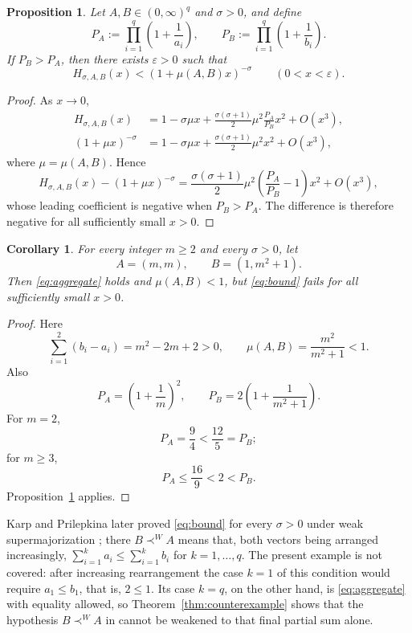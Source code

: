 \documentclass[11pt]{amsart}
\newtheorem{proposition}[theorem]{Proposition}
\newtheorem{corollary}[theorem]{Corollary}
\begin{document}
\begin{proposition}\label{prop:local}
Let $A,B\in(0,\infty)^q$ and $\sigma>0$, and define
\[
 P_A:=\prod_{i=1}^q\left(1+\frac1{a_i}\right),
 \qquad
 P_B:=\prod_{i=1}^q\left(1+\frac1{b_i}\right).
\]
If $P_B>P_A$, then there exists $\varepsilon>0$ such that
\[
 H_{\sigma,A,B}(x)<(1+\mu(A,B)x)^{-\sigma}
 \qquad (0<x<\varepsilon).
\]
\end{proposition}

\begin{proof}
As $x\to0$,
\begin{align*}
 H_{\sigma,A,B}(x)
 &=
 1-\sigma\mu x
 +\frac{\sigma(\sigma+1)}2
  \mu^2\frac{P_A}{P_B}x^2
 +O(x^3),\\
 (1+\mu x)^{-\sigma}
 &=
 1-\sigma\mu x
 +\frac{\sigma(\sigma+1)}2\mu^2x^2
 +O(x^3),
\end{align*}
where $\mu=\mu(A,B)$. Hence
\[
 H_{\sigma,A,B}(x)-(1+\mu x)^{-\sigma}
 =
 \frac{\sigma(\sigma+1)}2\mu^2
 \left(\frac{P_A}{P_B}-1\right)x^2
 +O(x^3),
\]
whose leading coefficient is negative when $P_B>P_A$. The difference is
therefore negative for all sufficiently small $x>0$.
\end{proof}

\begin{corollary}\label{cor:family}
For every integer $m\ge2$ and every $\sigma>0$, let
\[
 A=(m,m),
 \qquad
 B=(1,m^2+1).
\]
Then \eqref{eq:aggregate} holds and $\mu(A,B)<1$, but \eqref{eq:bound} fails
for all sufficiently small $x>0$.
\end{corollary}

\begin{proof}
Here
\[
 \sum_{i=1}^2(b_i-a_i)=m^2-2m+2>0,
 \qquad
 \mu(A,B)=\frac{m^2}{m^2+1}<1.
\]
Also
\[
 P_A=\left(1+\frac1m\right)^2,
 \qquad
 P_B=2\left(1+\frac1{m^2+1}\right).
\]
For $m=2$,
\[
 P_A=\frac94<\frac{12}{5}=P_B;
\]
for $m\ge3$,
\[
 P_A\le\frac{16}{9}<2<P_B.
\]
Proposition~\ref{prop:local} applies.
\end{proof}

Karp and Prilepkina later proved \eqref{eq:bound} for every $\sigma>0$
under weak supermajorization \cite[Theorem~5]{KP}; there $B\prec^W A$ means
that, both vectors being arranged increasingly,
$\sum_{i=1}^{k}a_i\le\sum_{i=1}^{k}b_i$ for $k=1,\ldots,q$. The present
example is not covered: after increasing rearrangement the case $k=1$ of
this condition would require $a_1\le b_1$, that is, $2\le1$. Its case
$k=q$, on the other hand, is \eqref{eq:aggregate} with equality allowed, so
Theorem~\ref{thm:counterexample} shows that the hypothesis $B\prec^W A$ in
\cite[Theorem~5]{KP} cannot be weakened to that final partial sum alone.
\end{document}
